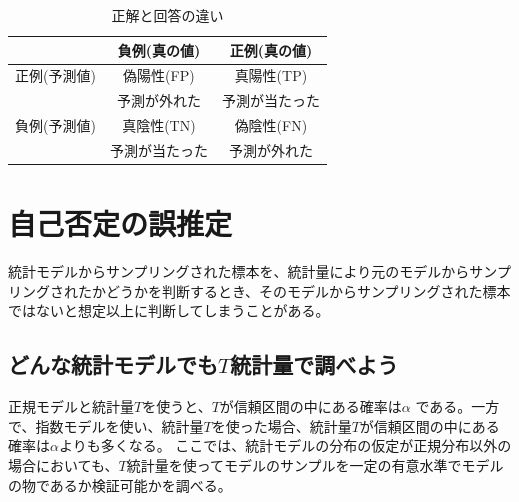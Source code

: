 \begin{table}[hbtp]
 \caption{正解と回答の違い}
 \label{table:Yes_no_answer}
 \centering
 \begin{tabular}{ccc}
  &  負例(真の値) & 正例(真の値)  \\
  \hline \hline
  正例(予測値) &  偽陽性(FP)  & 真陽性(TP)\\
  &予測が外れた & 予測が当たった\\
  負例(予測値) & 真陰性(TN) & 偽陰性(FN)\\
  & 予測が当たった & 予測が外れた\\
  \hline
 \end{tabular}
\end{table}



\section{自己否定の誤推定}
統計モデルからサンプリングされた標本を、統計量により元のモデルからサンプリングされたかどうかを判断するとき、そのモデルからサンプリングされた標本ではないと想定以上に判断してしまうことがある。





\subsection{どんな統計モデルでも$T$統計量で調べよう}
正規モデルと統計量$T$を使うと、$T$が信頼区間の中にある確率は$\alpha$ である。一方で、指数モデルを使い、統計量$T$を使った場合、統計量$T$が信頼区間の中にある確率は$\alpha$よりも多くなる。
ここでは、統計モデルの分布の仮定が正規分布以外の場合においても、$T$統計量を使ってモデルのサンプルを一定の有意水準でモデルの物であるか検証可能かを調べる。

